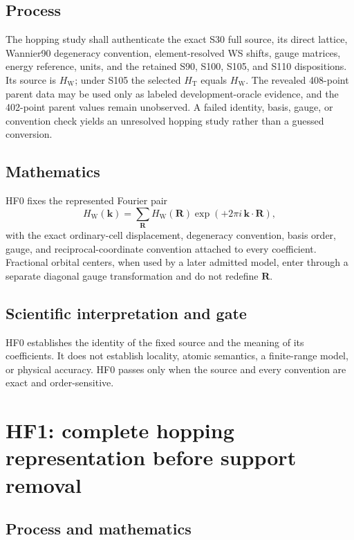 \documentclass[11pt]{report}
\begin{document}
\section{Process}

The hopping study shall authenticate the exact S30 full source, its direct lattice,
Wannier90 degeneracy convention, element-resolved WS shifts, gauge matrices, energy
reference, units, and the retained S90, S100, S105, and S110 dispositions.  Its source is
$H_{\mathrm{W}}$; under S105 the selected $H_{\mathrm{T}}$ equals
$H_{\mathrm{W}}$.  The revealed 408-point parent data may be used only as labeled
development-oracle evidence, and the 402-point parent values remain unobserved.  A
failed identity, basis, gauge, or convention check yields an unresolved hopping study
rather than a guessed conversion.

\section{Mathematics}

HF0 fixes the represented Fourier pair
\begin{equation}
 H_{\mathrm{W}}(\mathbf{k})=
 \sum_{\mathbf{R}}H_{\mathrm{W}}(\mathbf{R})
 \exp\!\left(+2\pi i\,\mathbf{k}\cdot\mathbf{R}\right),
 \label{eq:hf0-fourier-pair}
\end{equation}
with the exact ordinary-cell displacement, degeneracy convention, basis order, gauge,
and reciprocal-coordinate convention attached to every coefficient.  Fractional orbital
centers, when used by a later admitted model, enter through a separate diagonal gauge
transformation and do not redefine $\mathbf{R}$.

\section{Scientific interpretation and gate}

HF0 establishes the identity of the fixed source and the meaning of its coefficients.
It does not establish locality, atomic semantics, a finite-range model, or physical
accuracy.  HF0 passes only when the source and every convention are exact and
order-sensitive.

\chapter{HF1: complete hopping representation before support removal}

\section{Process and mathematics}
\end{document}
